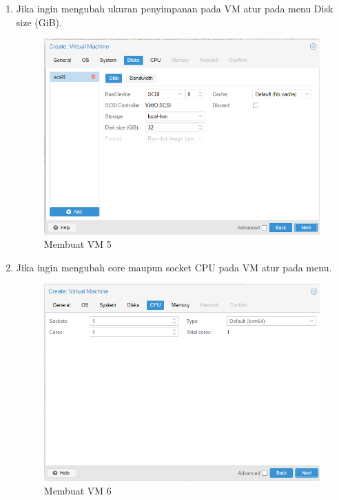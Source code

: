 \documentclass{article}
\begin{document}
\begin{enumerate}
  \item Jika ingin mengubah ukuran penyimpanan pada VM atur pada menu Disk size (GiB).
  \begin{figure}[h!]
    \centering
    \includegraphics[width=0.7\linewidth]{create vm 5.png}
    \caption{Membuat VM 5}
  \end{figure}
  \item Jika ingin mengubah core maupun socket CPU pada VM atur pada menu.
  \begin{figure}[h!]
    \centering
    \includegraphics[width=0.7\linewidth]{create vm 6.png}
    \caption{Membuat VM 6}
  \end{figure}
  \newpage


\end{enumerate}
\end{document}
